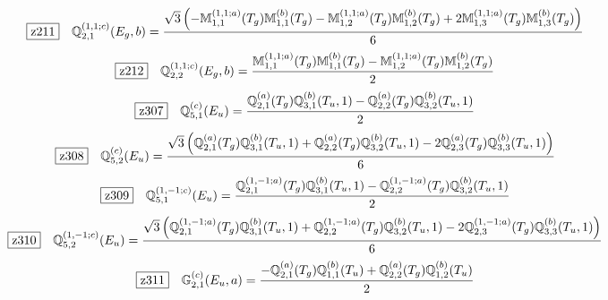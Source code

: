 \documentclass[fleqn,10pt,landscape]{jsarticle}
\begin{document}
\begin{dmath*}
\hspace*{3mm}\fbox{z211}\quad \mathbb{Q}_{2,1}^{(1,1;c)}(E_{g},b)=\frac{\sqrt{3} \left(- \mathbb{M}_{1,1}^{(1,1;a)}(T_{g}) \mathbb{M}_{1,1}^{(b)}(T_{g}) - \mathbb{M}_{1,2}^{(1,1;a)}(T_{g}) \mathbb{M}_{1,2}^{(b)}(T_{g}) + 2 \mathbb{M}_{1,3}^{(1,1;a)}(T_{g}) \mathbb{M}_{1,3}^{(b)}(T_{g})\right)}{6}
\end{dmath*}
\begin{dmath*}
\hspace*{3mm}\fbox{z212}\quad \mathbb{Q}_{2,2}^{(1,1;c)}(E_{g},b)=\frac{\mathbb{M}_{1,1}^{(1,1;a)}(T_{g}) \mathbb{M}_{1,1}^{(b)}(T_{g}) - \mathbb{M}_{1,2}^{(1,1;a)}(T_{g}) \mathbb{M}_{1,2}^{(b)}(T_{g})}{2}
\end{dmath*}
\begin{dmath*}
\hspace*{3mm}\fbox{z307}\quad \mathbb{Q}_{5,1}^{(c)}(E_{u})=\frac{\mathbb{Q}_{2,1}^{(a)}(T_{g}) \mathbb{Q}_{3,1}^{(b)}(T_{u},1) - \mathbb{Q}_{2,2}^{(a)}(T_{g}) \mathbb{Q}_{3,2}^{(b)}(T_{u},1)}{2}
\end{dmath*}
\begin{dmath*}
\hspace*{3mm}\fbox{z308}\quad \mathbb{Q}_{5,2}^{(c)}(E_{u})=\frac{\sqrt{3} \left(\mathbb{Q}_{2,1}^{(a)}(T_{g}) \mathbb{Q}_{3,1}^{(b)}(T_{u},1) + \mathbb{Q}_{2,2}^{(a)}(T_{g}) \mathbb{Q}_{3,2}^{(b)}(T_{u},1) - 2 \mathbb{Q}_{2,3}^{(a)}(T_{g}) \mathbb{Q}_{3,3}^{(b)}(T_{u},1)\right)}{6}
\end{dmath*}
\begin{dmath*}
\hspace*{3mm}\fbox{z309}\quad \mathbb{Q}_{5,1}^{(1,-1;c)}(E_{u})=\frac{\mathbb{Q}_{2,1}^{(1,-1;a)}(T_{g}) \mathbb{Q}_{3,1}^{(b)}(T_{u},1) - \mathbb{Q}_{2,2}^{(1,-1;a)}(T_{g}) \mathbb{Q}_{3,2}^{(b)}(T_{u},1)}{2}
\end{dmath*}
\begin{dmath*}
\hspace*{3mm}\fbox{z310}\quad \mathbb{Q}_{5,2}^{(1,-1;c)}(E_{u})=\frac{\sqrt{3} \left(\mathbb{Q}_{2,1}^{(1,-1;a)}(T_{g}) \mathbb{Q}_{3,1}^{(b)}(T_{u},1) + \mathbb{Q}_{2,2}^{(1,-1;a)}(T_{g}) \mathbb{Q}_{3,2}^{(b)}(T_{u},1) - 2 \mathbb{Q}_{2,3}^{(1,-1;a)}(T_{g}) \mathbb{Q}_{3,3}^{(b)}(T_{u},1)\right)}{6}
\end{dmath*}
\begin{dmath*}
\hspace*{3mm}\fbox{z311}\quad \mathbb{G}_{2,1}^{(c)}(E_{u},a)=\frac{- \mathbb{Q}_{2,1}^{(a)}(T_{g}) \mathbb{Q}_{1,1}^{(b)}(T_{u}) + \mathbb{Q}_{2,2}^{(a)}(T_{g}) \mathbb{Q}_{1,2}^{(b)}(T_{u})}{2}
\end{dmath*}
\end{document}
